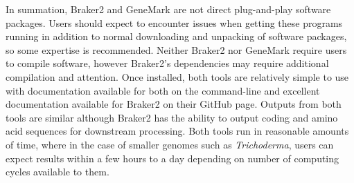 In summation, Braker2 and GeneMark are not direct plug-and-play
software packages. Users should expect to encounter issues when
getting these programs running in addition to normal downloading and
unpacking of software packages, so some expertise is
recommended. Neither Braker2 nor GeneMark require users to compile
software, however Braker2's dependencies may require additional
compilation and attention. Once installed, both tools are relatively
simple to use with documentation available for both on the command-line
and excellent documentation available for Braker2 on their GitHub
page. Outputs from both tools are similar although Braker2 has the
ability to output coding and amino acid sequences for downstream
processing. Both tools run in reasonable amounts of time, where in the
case of smaller genomes such as \textit{Trichoderma}, users can expect
results within a few hours to a day depending on number of computing
cycles available to them.
